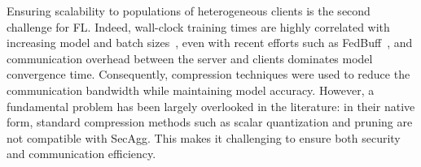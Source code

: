 \documentclass[11pt]{article}
\newcommand{\SecAgg}{{\sc SecAgg}\xspace}
\newcommand{\karthik}[1]{{\color{blue}Karthik: #1}}
\newcommand{\ashkan}[1]{{\color{blue}Ashkan: #1}}
\begin{document}
Ensuring scalability to populations of heterogeneous clients is the second challenge for FL.
Indeed, wall-clock training times are highly correlated with increasing model and batch sizes~\cite{Graham-huba2021papaya}, even with recent efforts such as FedBuff~\cite{Graham-nguyen2021federated},
and communication overhead between the server and clients dominates model convergence time.
Consequently, compression techniques were used to reduce the communication bandwidth while maintaining model accuracy.
However, a fundamental problem has been largely overlooked in the literature: in their native form, standard compression methods such as scalar quantization and pruning are not compatible with \SecAgg.
This makes it challenging to ensure both security and communication efficiency.
\end{document}

